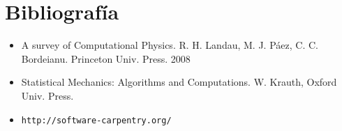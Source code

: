\documentclass[12pt]{article}
\begin{document}
\section*{Bibliograf\'ia}
\begin{itemize}
\item
A survey of Computational Physics. R. H. Landau, M. J. P\'aez, C. C.
Bordeianu. Princeton Univ. Press. 2008 
\item
Statistical Mechanics: Algorithms and Computations. W. Krauth, Oxford Univ. Press. 
\item\verb"http://software-carpentry.org/"
\end{itemize}

 
\end{document}
